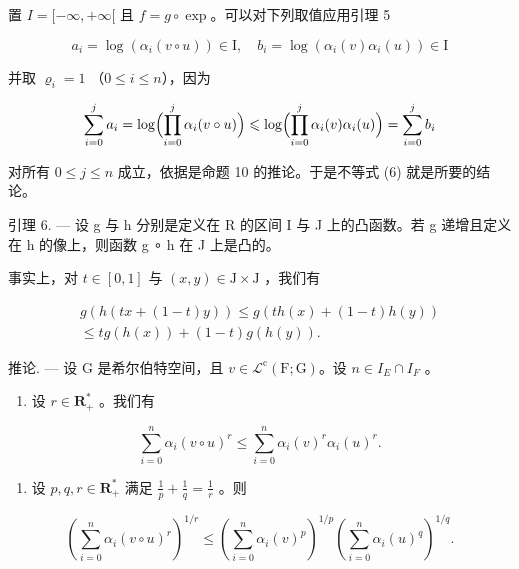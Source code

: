 置 \(I = [-\infty, +\infty[\) 且 \(f = g \circ \exp\)。可以对下列取值应用引理 5

\[
a _ {i} = \log (\alpha_ {i} (v \circ u)) \in \mathrm{I}, \quad b _ {i} = \log (\alpha_ {i} (v) \alpha_ {i} (u)) \in \mathrm{I}
\]

并取 \(\varrho_{i} = 1\) （\(0\leqslant i\leqslant n\)），因为

\[
\sum_ {i = 0} ^ {j} a _ {i} = \log \Bigl (\prod_ {i = 0} ^ {j} \alpha_ {i} (v \circ u) \Bigr) \leqslant \log \Bigl (\prod_ {i = 0} ^ {j} \alpha_ {i} (v) \alpha_ {i} (u) \Bigr) = \sum_ {i = 0} ^ {j} b _ {i}
\]

对所有 \(0 \leqslant j \leqslant n\) 成立，依据是命题 10 的推论。于是不等式 (6) 就是所要的结论。

引理 6. --- 设 g 与 h 分别是定义在 R 的区间 I 与 J 上的凸函数。若 g 递增且定义在 h 的像上，则函数 g ∘ h 在 J 上是凸的。

事实上，对 \(t \in [0,1]\) 与 \((x,y) \in \mathrm{J} \times \mathrm{J}\) ，我们有

\[
\begin{array}{c} g (h (t x + (1 - t) y)) \leqslant g (t h (x) + (1 - t) h (y)) \\ \leqslant t g (h (x)) + (1 - t) g (h (y)). \end{array}
\]

推论. --- 设 G 是希尔伯特空间，且 \(v \in \mathcal{L}^{\mathrm{c}}(\mathrm{F};\mathrm{G})\)。设 \(n \in I_{E} \cap I_{F}\) 。

\begin{enumerate}
\def\labelenumi{\alph{enumi})}
\tightlist
\item
  设 \(r \in \mathbf{R}_{+}^{*}\) 。我们有
\end{enumerate}

\[
\sum_ {i = 0} ^ {n} \alpha_ {i} (v \circ u) ^ {r} \leqslant \sum_ {i = 0} ^ {n} \alpha_ {i} (v) ^ {r} \alpha_ {i} (u) ^ {r}.
\]

\begin{enumerate}
\def\labelenumi{\alph{enumi})}
\setcounter{enumi}{1}
\tightlist
\item
  设 \(p, q, r \in \mathbf{R}_{+}^{*}\) 满足 \(\frac{1}{p} + \frac{1}{q} = \frac{1}{r}\) 。则
\end{enumerate}

\[
\left(\sum_ {i = 0} ^ {n} \alpha_ {i} (v \circ u) ^ {r}\right) ^ {1 / r} \leqslant \left(\sum_ {i = 0} ^ {n} \alpha_ {i} (v) ^ {p}\right) ^ {1 / p} \left(\sum_ {i = 0} ^ {n} \alpha_ {i} (u) ^ {q}\right) ^ {1 / q}.
\]

